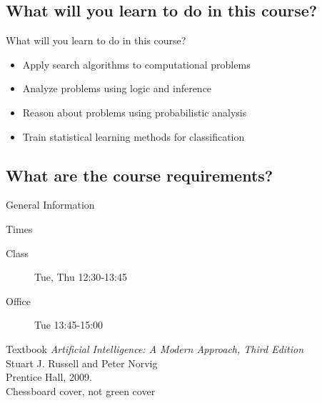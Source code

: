 \documentclass[14pt]{beamer}
\begin{document}
\subsection*{What will you learn to do in this course?}
\begin{frame}{What will you learn to do in this course?}
	\begin{itemize}
		\item Apply search algorithms to computational problems
		\item Analyze problems using logic and inference
		\item Reason about problems using probabilistic analysis
		\item Train statistical learning methods for classification
	\end{itemize}
\end{frame}

\subsection*{What are the course requirements?}

\begin{frame}{General Information}
	\begin{block}{Times}
		\begin{description}
			\item[Class] Tue, Thu 12:30-13:45
			\item[Office] Tue 13:45-15:00
		\end{description}
	\end{block}
	\begin{block}{Textbook}
		\textit{Artificial Intelligence: A Modern Approach, Third Edition}\\		
		Stuart J. Russell and Peter Norvig\\
		Prentice Hall, 2009.\\
		\hfill \alert{Chessboard cover, not green cover}
	\end{block}
\end{frame}
\end{document}
